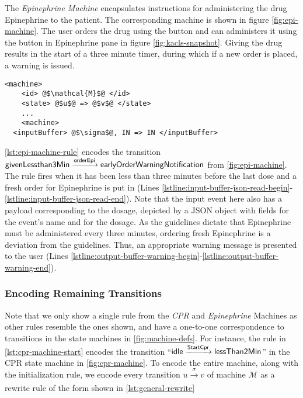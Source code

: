 The \textit{Epinephrine Machine} encapsulates instructions for administering
the drug Epinephrine to the patient. The corresponding machine is shown in figure
\ref{fig:epi-machine}.  The user orders the drug using the
 button and can administers it using the  button in
Epinephrine pane in figure \ref{fig:kacls-snapshot}. Giving the drug results in the
start of a three minute timer, during which if a new order is placed, a warning
is issued.

\begin{lstlisting}[float=b!,
  frame=single,
  style=ksty,
  language=k,
  label={lst:general-rewrite},
  caption={Transitions as $\K$-Rules}
]
  <machine>
    <id> @$\mathcal{M}$@ </id>
    <state> @$u$@ => @$v$@ </state>
    ...
    <machine>
  <inputBuffer> @$\sigma$@, IN => IN </inputBuffer>
\end{lstlisting}

\autoref{lst:epi-machine-rule} encodes the transition
$\text{\sffamily givenLessthan3Min} \xrightarrow[]{\text{\sffamily orderEpi}}
\text{\sffamily earlyOrderWarningNotification}$ from \autoref{fig:epi-machine}.
The rule fires when it has been less than three minutes
before the last dose and a fresh order for
Epinephrine is put in (Lines
\ref{lstline:input-buffer-json-read-begin}-\ref{lstline:input-buffer-json-read-end}).
Note that the input event here also has a payload corresponding to the dosage,
depicted by a JSON object with fields  for the event's name
and  for the dosage.
As the guidelines dictate that Epinephrine must be administered
every three minutes, ordering fresh Epinephrine is a deviation from the
guidelines. Thus, an appropriate warning message is presented to the user (Lines
\ref{lstline:output-buffer-warning-begin}-\ref{lstline:output-buffer-warning-end}).

\subsubsection{Encoding Remaining Transitions}

Note that we only show a single rule from the \textit{CPR} and
\textit{Epinephrine} Machines as other rules resemble the ones
shown, and have a one-to-one correspondence to transitions in the
state machines in \autoref{fig:machine-defs}. For instance,
the rule in \autoref{lst:cpr-machine-start} encodes the transition
``$\text{\sffamily idle} \xrightarrow[]{\text{\sffamily StartCpr}} \text{\sffamily lessThan2Min}$'' in the
CPR state machine in \autoref{fig:cpr-machine}. To encode the entire machine,
along with the initialization rule,
we encode every transition $u \xrightarrow[]{\sigma} v$
of machine $\mathcal{M}$ as a rewrite rule of the form shown in
\autoref{lst:general-rewrite}

